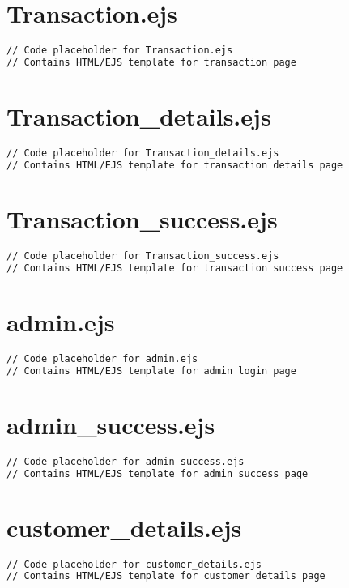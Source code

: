 \documentclass[12pt,a4paper]{report}
\begin{document}
\section{Transaction.ejs}
\begin{lstlisting}[language=HTML]
// Code placeholder for Transaction.ejs
// Contains HTML/EJS template for transaction page
\end{lstlisting}

\section{Transaction\_details.ejs}
\begin{lstlisting}[language=HTML]
// Code placeholder for Transaction_details.ejs
// Contains HTML/EJS template for transaction details page
\end{lstlisting}

\section{Transaction\_success.ejs}
\begin{lstlisting}[language=HTML]
// Code placeholder for Transaction_success.ejs
// Contains HTML/EJS template for transaction success page
\end{lstlisting}

\section{admin.ejs}
\begin{lstlisting}[language=HTML]
// Code placeholder for admin.ejs
// Contains HTML/EJS template for admin login page
\end{lstlisting}

\section{admin\_success.ejs}
\begin{lstlisting}[language=HTML]
// Code placeholder for admin_success.ejs
// Contains HTML/EJS template for admin success page
\end{lstlisting}

\section{customer\_details.ejs}
\begin{lstlisting}[language=HTML]
// Code placeholder for customer_details.ejs
// Contains HTML/EJS template for customer details page
\end{lstlisting}
\end{document}
